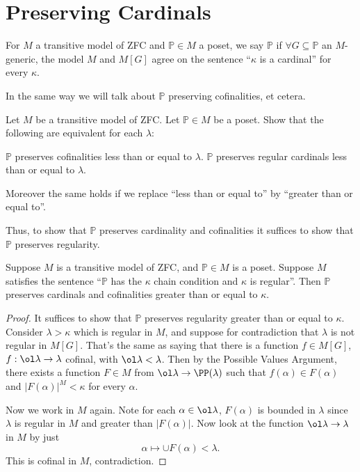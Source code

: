 \documentclass[11pt]{scrreprt}
\newcommand{\Po}{\mathbb P}
\begin{document}
\section{Preserving Cardinals}
\begin{definition}
	For $M$ a transitive model of ZFC and $\Po \in M$ a poset,
	we say $\Po$  if
	$\forall G \subseteq \Po$ an $M$-generic,
	the model $M$ and $M[G]$ agree on the sentence ``$\kappa$ is a cardinal'' for every $\kappa$.

	In the same way we will talk about $\Po$ preserving cofinalities, et cetera.
\end{definition}

\begin{exercise}
	Let $M$ be a transitive model of ZFC.
	Let $\Po \in M$ be a poset.
	Show that the following are equivalent for each $\lambda$:
	\begin{enumerate}[(1)]
		\ii $\Po$ preserves cofinalities less than or equal to $\lambda$.
		\ii $\Po$ preserves regular cardinals less than or equal to $\lambda$.
	\end{enumerate}
	Moreover the same holds if we replace ``less than or equal to''
	by ``greater than or equal to''.
\end{exercise}
Thus, to show that $\Po$ preserves cardinality and cofinalities it suffices to show that $\Po$ preserves regularity.

\begin{theorem}
	Suppose $M$ is a transitive model of ZFC, and $\Po \in M$ is a poset.
	Suppose $M$ satisfies the sentence ``$\Po$ has the $\kappa$ chain condition and $\kappa$ is regular''.
	Then $\Po$ preserves cardinals and cofinalities greater than or equal to $\kappa$.
\end{theorem}
\begin{proof}
	It suffices to show that $\Po$ preserves regularity greater than or equal to $\kappa$.
	Consider $\lambda > \kappa$ which is regular in $M$,
	and suppose for contradiction that $\lambda$ is not regular in $M[G]$.
	That's the same as saying that there is a function $f \in M[G]$,
	$f : \ol \lambda \to \lambda$ cofinal, with $\ol \lambda < \lambda$.
	Then by the Possible Values Argument,
	there exists a function $F \in M$ from $\ol \lambda \to \PP(\lambda)$
	such that $f(\alpha) \in F(\alpha)$ and $\left\lvert F(\alpha) \right\rvert^M < \kappa$
	for every $\alpha$.

	Now we work in $M$ again.
	Note for each $\alpha \in \ol\lambda$, $F(\alpha)$ is bounded in $\lambda$ since $\lambda$ is regular in $M$ and greater than $\left\lvert F(\alpha) \right\rvert$.
	Now look at the function $\ol \lambda \to \lambda$ in $M$ by just
	\[ \alpha \mapsto \cup F(\alpha) < \lambda. \]
	This is cofinal in $M$, contradiction.
\end{proof}
\end{document}
